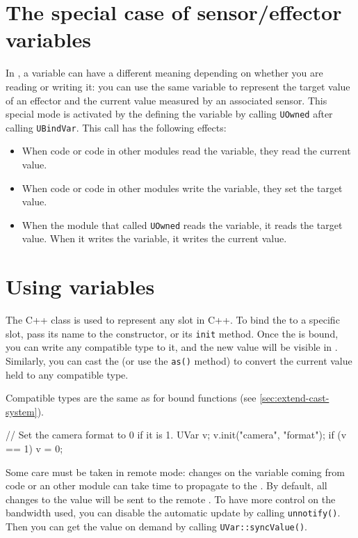 \section{The special case of sensor/effector variables}

In \urbi, a variable can have a different meaning depending on whether you
are reading or writing it: you can use the same variable to represent the
target value of an effector and the current value measured by an associated
sensor. This special mode is activated by the \UObject defining the variable
by calling \lstinline{UOwned} after calling \lstinline{UBindVar}. This call
has the following effects:
\begin{itemize}
\item When \urbi code or code in other modules read the variable, they read
  the current value.
\item When \urbi code or code in other modules write the variable, they set
  the target value.
\item When the module that called \lstinline|UOwned| reads the variable, it
  reads the target value. When it writes the variable, it writes the current
  value.
\end{itemize}

\section{Using \urbi variables}

The C++ class \UVar is used to represent any \urbi slot in C++.  To bind the
\UVar to a specific slot, pass its name to the \UVar constructor, or its
\lstinline|init| method.  Once the \UVar is bound, you can write any
compatible type to it, and the new value will be visible in \us.  Similarly,
you can cast the \UVar (or use the \lstinline{as()} method) to convert the
current \us value held to any compatible type.

Compatible types are the same as for bound functions (see
\autoref{sec:extend-cast-system}).

\begin{cxx}
// Set the camera format to 0 if it is 1.
UVar v;
v.init("camera", "format");
if (v == 1)
 v = 0;
\end{cxx}

Some care must be taken in remote mode: changes on the variable coming from
\urbi code or an other module can take time to propagate to the \UVar. By
default, all changes to the value will be sent to the remote \UObject. To
have more control on the bandwidth used, you can disable the automatic
update by calling \lstinline|unnotify()|. Then you can get the value on
demand by calling \lstinline|UVar::syncValue()|.

